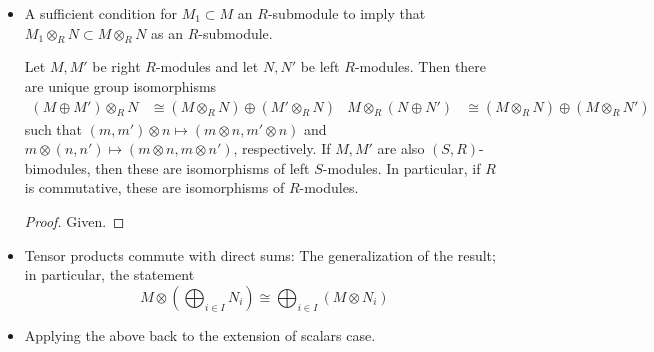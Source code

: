 \documentclass[../notes.tex]{subfiles}
\begin{document}
\begin{itemize}
\begin{corollary}
\begin{figure}[H]
            \caption{Universal property of the $n$-fold tensor product.}
            \label{fig:univPropM1Mn}
        \end{figure}
        \begin{proof}
            We may prove this from first principles analogously to the above. Alternatively, we can invoke Theorem \ref{trm:10.14} and Corollary \ref{cly:10.15} to obtain the $n$-fold tensor product unambiguously and then applying Theorem \ref{trm:10.10} and Corollary \ref{cly:10.12} repeatedly.
        \end{proof}
    \end{corollary}
    \item A sufficient condition for $M_1\subset M$ an $R$-submodule to imply that $M_1\otimes_RN\subset M\otimes_RN$ as an $R$-submodule.
    \begin{theorem}\label{trm:10.17}
        Let $M,M'$ be right $R$-modules and let $N,N'$ be left $R$-modules. Then there are unique group isomorphisms
        \begin{align*}
            (M\oplus M')\otimes_RN &\cong (M\otimes_RN)\oplus(M'\otimes_RN)&
            M\otimes_R(N\oplus N') &\cong (M\otimes_RN)\oplus(M\otimes_RN')
        \end{align*}
        such that $(m,m')\otimes n\mapsto(m\otimes n,m'\otimes n)$ and $m\otimes(n,n')\mapsto(m\otimes n,m\otimes n')$, respectively. If $M,M'$ are also $(S,R)$-bimodules, then these are isomorphisms of left $S$-modules. In particular, if $R$ is commutative, these are isomorphisms of $R$-modules.
        \begin{proof}
            Given.
        \end{proof}
    \end{theorem}
    \item Tensor products commute with direct sums: The generalization of the result; in particular, the statement
    \begin{equation*}
        M\otimes\left( \bigoplus_{i\in I}N_i \right) \cong \bigoplus_{i\in I}(M\otimes N_i)
    \end{equation*}
    \item Applying the above back to the extension of scalars case.

\end{itemize}
\end{document}
